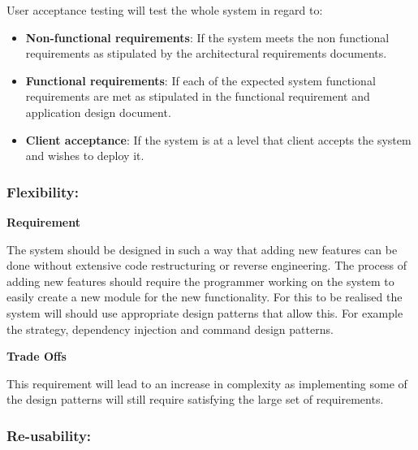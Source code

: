 \begin{flushleft}
\begin{itemize}
\end{itemize}

User acceptance testing will test the whole system in regard to:
\begin{itemize}

\item\textbf{Non-functional requirements}: If the system meets the non functional requirements as stipulated by the architectural requirements documents.
\item\textbf{Functional requirements}: If each of the expected system functional requirements are met as stipulated in the functional requirement and application design document.
\item\textbf{Client acceptance}: If the system is at a level that client accepts the system and wishes to deploy it.

\end{itemize}

\end{flushleft}

\newpage
\subsubsection{Flexibility:}

\begin{flushleft}
\vspace{0.1in}

\textbf{Requirement}

The system should be designed in such a way that adding new features can be done without extensive code restructuring or reverse engineering. The process of adding new features should require the programmer working on the system to easily create a new module for the new functionality. For this to be realised the system will should use appropriate design patterns that allow this. For example the strategy, dependency injection and command design patterns. 
\vspace{0.1in}

\textbf{Trade Offs}

This requirement will lead to an increase in complexity as implementing some of the design patterns will still require satisfying the large set of requirements.

\vspace{0.1in}

\end{flushleft}


\subsubsection{Re-usability:}


